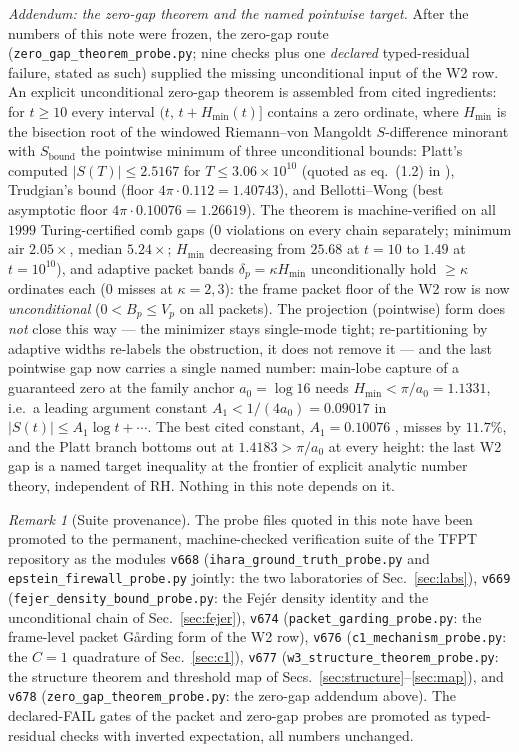 \documentclass[11pt,a4paper]{article}
\theoremstyle{remark}
\newtheorem{remark}[theorem]{Remark}
\begin{document}
\emph{Addendum: the zero-gap theorem and the named pointwise target.}
After the numbers of this note were frozen, the zero-gap route
(\texttt{zero\_gap\_theorem\_probe.py}; nine checks plus one
\emph{declared} typed-residual failure, stated as such) supplied the
missing unconditional input of the W2 row.  An explicit unconditional
zero-gap theorem is assembled from cited ingredients: for $t\ge10$
every interval $(t,\,t+H_{\min}(t)]$ contains a zero ordinate, where
$H_{\min}$ is the bisection root of the windowed Riemann--von Mangoldt
$S$-difference minorant with $S_{\mathrm{bound}}$ the pointwise
minimum of three unconditional bounds: Platt's computed
$|S(T)|\le2.5167$ for $T\le3.06\times10^{10}$ \cite{Pla17,BW25}
(quoted as eq.~(1.2) in \cite{BW25}), Trudgian's bound \cite{Tru14}
(floor $4\pi\cdot0.112=1.40743$), and Bellotti--Wong
\cite[Cor.~1.5]{BW25} (best asymptotic floor
$4\pi\cdot0.10076=1.26619$).  The theorem is machine-verified on all
$1999$ Turing-certified comb gaps ($0$ violations on every chain
separately; minimum air $2.05\times$, median $5.24\times$; $H_{\min}$
decreasing from $25.68$ at $t=10$ to $1.49$ at $t=10^{10}$), and
adaptive packet bands $\delta_p=\kappa H_{\min}$ unconditionally hold
$\ge\kappa$ ordinates each ($0$ misses at $\kappa=2,3$): the frame
packet floor of the W2 row is now \emph{unconditional}
($0<B_p\le V_p$ on all packets).  The projection (pointwise) form
does \emph{not} close this way --- the minimizer stays single-mode
tight; re-partitioning by adaptive widths re-labels the obstruction,
it does not remove it --- and the last pointwise gap now carries a
single named number: main-lobe capture of a guaranteed zero at the
family anchor $a_0=\log16$ needs $H_{\min}<\pi/a_0=1.1331$, i.e.\ a
leading argument constant $A_1<1/(4a_0)=0.09017$ in
$|S(t)|\le A_1\log t+\cdots$.  The best cited constant, $A_1=0.10076$
\cite{BW25}, misses by $11.7\%$, and the Platt branch bottoms out at
$1.4183>\pi/a_0$ at every height: the last W2 gap is a named target
inequality at the frontier of explicit analytic number theory,
independent of RH.  Nothing in this note depends on it.

\begin{remark}[Suite provenance]\label{rem:suite}
The probe files quoted in this note have been promoted to the
permanent, machine-checked verification suite of the TFPT repository
\cite{TFPT} as the modules \texttt{v668}
(\texttt{ihara\_ground\_truth\_probe.py} and
\texttt{epstein\_firewall\_probe.py} jointly: the two laboratories of
Sec.~\ref{sec:labs}), \texttt{v669}
(\texttt{fejer\_density\_bound\_probe.py}: the Fej\'er density
identity and the unconditional chain of Sec.~\ref{sec:fejer}),
\texttt{v674} (\texttt{packet\_garding\_probe.py}: the frame-level
packet G\r{a}rding form of the W2 row), \texttt{v676}
(\texttt{c1\_mechanism\_probe.py}: the $C=1$ quadrature of
Sec.~\ref{sec:c1}), \texttt{v677}
(\texttt{w3\_structure\_theorem\_probe.py}: the structure theorem and
threshold map of Secs.~\ref{sec:structure}--\ref{sec:map}), and
\texttt{v678} (\texttt{zero\_gap\_theorem\_probe.py}: the zero-gap
addendum above).  The declared-FAIL gates of the packet and zero-gap
probes are promoted as typed-residual checks with inverted
expectation, all numbers unchanged.
\end{remark}
\end{document}
